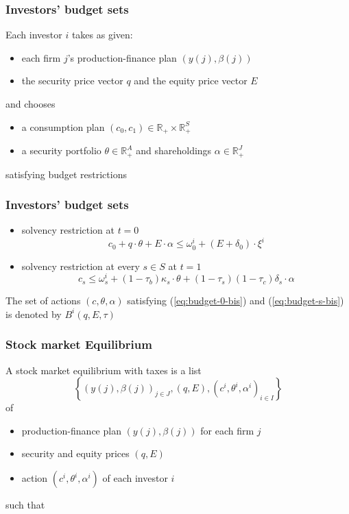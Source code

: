 \documentclass[blue]{beamer}
\def\R{\mathbb{R}}
\def\leq{\leqslant}
\theoremstyle{definition}
\theoremstyle{example}
\begin{document}

\begin{frame}\frametitle{Investors' budget sets}

Each investor $i$ takes as given:
    \begin{itemize}
    \item each firm $j$'s production-finance plan $(y(j),\beta(j))$
    \item the security price vector $q$ and the equity price vector $E$
    \end{itemize}
and chooses
    \begin{itemize}
    \item a consumption plan $(c_0,c_1) \in \R_+ \times \R^S_+$
    \item a security portfolio $\theta\in \R^A_+$ and shareholdings $\alpha \in \R^J_+$
    \end{itemize}
satisfying budget restrictions

\end{frame}


\begin{frame}\frametitle{Investors' budget sets}

\begin{itemize}
\item solvency restriction at $t=0$
\begin{equation}\label{eq:budget-0-bis}
c_0 + q\cdot \theta + E \cdot \alpha \leq \omega^i_0 + (E + \delta_0) \cdot \xi^i
\end{equation}
\item solvency restriction at every $s\in S$ at $t=1$
\begin{equation}\label{eq:budget-s-bis}
c_s \leq \omega^i_s + (1-\tau_b)\kappa_s \cdot \theta + (1-\tau_s)(1-\tau_c)\delta_s \cdot \alpha
\end{equation}
\end{itemize}

The set of actions $(c,\theta,\alpha)$ satisfying (\ref{eq:budget-0-bis}) and (\ref{eq:budget-s-bis}) is denoted by $B^i(q,E,\tau)$

\end{frame}


\begin{frame}\frametitle{Stock market Equilibrium}

A stock market equilibrium with taxes is a list
\[
\left\{ (y(j),\beta(j))_{j\in J}, (q,E), (c^i,\theta^i,\alpha^i)_{i\in I}\right\}
\]
of
\begin{itemize}
\item production-finance plan $(y(j),\beta(j))$ for each firm $j$
\item security and equity prices $(q,E)$
\item action $(c^i,\theta^i,\alpha^i)$ of each investor $i$
\end{itemize}
such that
\end{frame}
\end{document}
